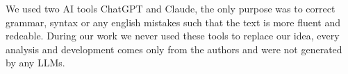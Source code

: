 We used two AI tools ChatGPT and Claude, the only purpose was to correct grammar, syntax or any english mistakes such that the text is more fluent and redeable. During our work we never used these tools to replace our idea, every analysis and development comes only from the authors and were not generated by any LLMs.